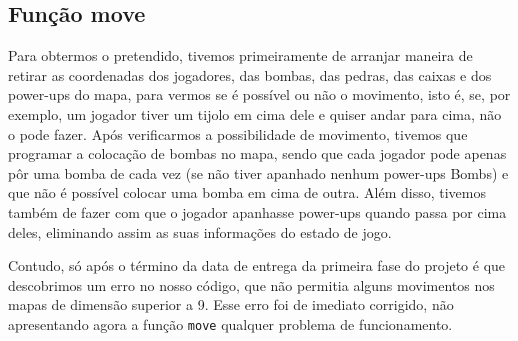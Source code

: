 \documentclass[a4paper]{article}
\begin{document}
\subsection{Função move}

Para obtermos o pretendido, tivemos primeiramente de arranjar maneira de retirar as coordenadas dos jogadores, das bombas, das pedras, das caixas e dos power-ups do mapa, para vermos se é possível ou não o movimento, isto é, se, por exemplo, um jogador tiver um tijolo em cima dele e quiser andar para cima, não o pode fazer. Após verificarmos a possibilidade de movimento, tivemos que programar a colocação de bombas no mapa, sendo que cada jogador pode apenas pôr uma bomba de cada vez (se não tiver apanhado nenhum power-ups Bombs) e que não é possível colocar uma bomba em cima de outra. Além disso, tivemos também de fazer com que o jogador apanhasse power-ups quando passa por cima deles, eliminando assim as suas informações do estado de jogo.

Contudo, só após o término da data de entrega da primeira fase do projeto é que descobrimos um erro no nosso código, que não permitia alguns movimentos nos mapas de dimensão superior a 9. Esse erro foi de imediato corrigido, não apresentando agora a função \texttt{move} qualquer problema de funcionamento.
\end{document}
